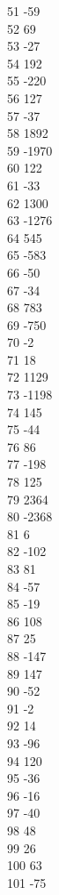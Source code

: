 { 51	-59 \\
 52	69 \\
 53	-27 \\
 54	192 \\
 55	-220 \\
 56	127 \\
 57	-37 \\
 58	1892 \\
 59	-1970 \\
 60	122 \\
 61	-33 \\
 62	1300 \\
 63	-1276 \\
 64	545 \\
 65	-583 \\
 66	-50 \\
 67	-34 \\
 68	783 \\
 69	-750 \\
 70	-2 \\
 71	18 \\
 72	1129 \\
 73	-1198 \\
 74	145 \\
 75	-44 \\
 76	86 \\
 77	-198 \\
 78	125 \\
 79	2364 \\
 80	-2368 \\
 81	6 \\
 82	-102 \\
 83	81 \\
 84	-57 \\
 85	-19 \\
 86	108 \\
 87	25 \\
 88	-147 \\
 89	147 \\
 90	-52 \\
 91	-2 \\
 92	14 \\
 93	-96 \\
 94	120 \\
 95	-36 \\
 96	-16 \\
 97	-40 \\
 98	48 \\
 99	26 \\
 100	63 \\
 101	-75 \\
}
